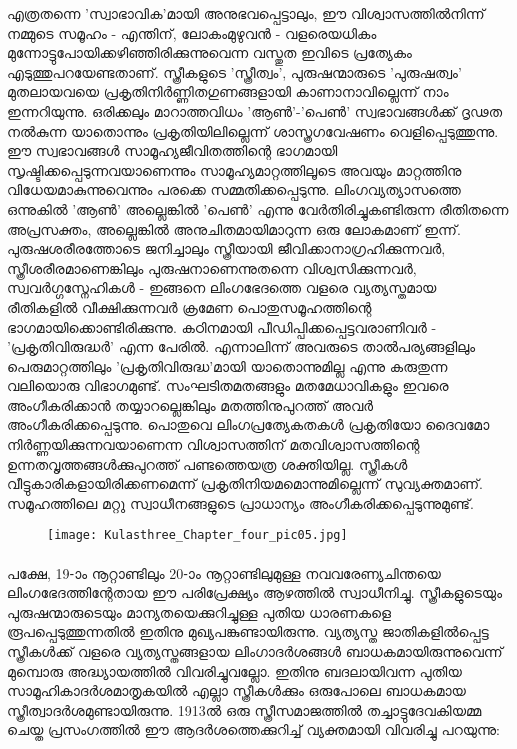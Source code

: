എത്രതന്നെ 'സ്വാഭാവിക'മായി അനുഭവപ്പെട്ടാലും, ഈ വിശ്വാസത്തിൽനിന്ന് നമ്മുടെ സമൂഹം - എന്തിന്, ലോകംമുഴുവൻ - വളരെയധികം മുന്നോട്ടുപോയിക്കഴിഞ്ഞിരിക്കുന്നുവെന്ന വസ്തുത ഇവിടെ പ്രത്യേകം എടുത്തുപറയേണ്ടതാണ്. സ്ത്രീകളുടെ 'സ്ത്രീത്വം', പുരുഷന്മാരുടെ 'പുരുഷത്വം' മുതലായവയെ പ്രകൃതിനിർണ്ണിതഗുണങ്ങളായി കാണാനാവില്ലെന്ന് നാം ഇന്നറിയുന്നു. ഒരിക്കലും മാറാത്തവിധം 'ആൺ'-'പെൺ' സ്വഭാവങ്ങൾക്ക് ദൃഢത നൽകുന്ന യാതൊന്നും പ്രകൃതിയിലില്ലെന്ന് ശാസ്ത്രഗവേഷണം വെളിപ്പെടുത്തുന്നു. ഈ സ്വഭാവങ്ങൾ സാമൂഹ്യജീവിതത്തിന്റെ ഭാഗമായി സൃഷ്ടിക്കപ്പെടുന്നവയാണെന്നും സാമൂഹ്യമാറ്റത്തിലൂടെ അവയും മാറ്റത്തിനു വിധേയമാകുന്നുവെന്നും പരക്കെ സമ്മതിക്കപ്പെടുന്നു. ലിംഗവ്യത്യാസത്തെ ഒന്നുകിൽ 'ആൺ' അല്ലെങ്കിൽ 'പെൺ' എന്നു വേർതിരിച്ചുകണ്ടിരുന്ന രീതിതന്നെ അപ്രസക്തം, അല്ലെങ്കിൽ അനുചിതമായിമാറുന്ന ഒരു ലോകമാണ് ഇന്ന്. പുരുഷശരീരത്തോടെ ജനിച്ചാലും സ്ത്രീയായി ജീവിക്കാനാഗ്രഹിക്കുന്നവർ, സ്ത്രീശരീരമാണെങ്കിലും പുരുഷനാണെന്നുതന്നെ വിശ്വസിക്കുന്നവർ, സ്വവർഗ്ഗസ്നേഹികൾ - ഇങ്ങനെ ലിംഗഭേദത്തെ വളരെ വ്യത്യസ്തമായ രീതികളിൽ വീക്ഷിക്കുന്നവർ ക്രമേണ പൊതുസമൂഹത്തിന്റെ ഭാഗമായിക്കൊണ്ടിരിക്കുന്നു. കഠിനമായി പീഡിപ്പിക്കപ്പെട്ടവരാണിവർ - 'പ്രകൃതിവിരുദ്ധർ' എന്ന പേരിൽ. എന്നാലിന്ന് അവരുടെ താൽപര്യങ്ങളിലും പെരുമാറ്റത്തിലും 'പ്രകൃതിവിരുദ്ധ'മായി യാതൊന്നുമില്ല എന്നു കരുതുന്ന വലിയൊരു വിഭാഗമുണ്ട്. സംഘടിതമതങ്ങളും മതമേധാവികളും ഇവരെ അംഗീകരിക്കാൻ തയ്യാറല്ലെങ്കിലും മതത്തിനുപുറത്ത് അവർ അംഗീകരിക്കപ്പെടുന്നു. പൊതുവെ ലിംഗപ്രത്യേകതകൾ പ്രകൃതിയോ ദൈവമോ നിർണ്ണയിക്കുന്നവയാണെന്ന വിശ്വാസത്തിന് മതവിശ്വാസത്തിന്റെ ഉന്നതവൃത്തങ്ങൾക്കുപുറത്ത് പണ്ടത്തെയത്ര ശക്തിയില്ല. സ്ത്രീകൾ വീട്ടുകാരികളായിരിക്കണമെന്ന് പ്രകൃതിനിയമമൊന്നുമില്ലെന്ന് സുവ്യക്തമാണ്. സമൂഹത്തിലെ മറ്റു സ്വാധീനങ്ങളുടെ പ്രാധാന്യം അംഗീകരിക്കപ്പെടുന്നുമുണ്ട്.

\begin{figure}[h]
\begin{center}
\texttt{[image: Kulasthree\_Chapter\_four\_pic05.jpg]}
\end{center}
\end{figure}


\paragraph{}പക്ഷേ, 19-ാം നൂറ്റാണ്ടിലും 20-ാം നൂറ്റാണ്ടിലുമുള്ള നവവരേണ്യചിന്തയെ ലിംഗഭേദത്തിന്റേതായ ഈ പരിപ്രേക്ഷ്യം ആഴത്തിൽ സ്വാധീനിച്ചു. സ്ത്രീകളുടെയും പുരുഷന്മാരുടെയും മാന്യതയെക്കുറിച്ചുള്ള പുതിയ ധാരണകളെ രൂപപ്പെടുത്തുന്നതിൽ ഇതിനു മുഖ്യപങ്കുണ്ടായിരുന്നു. വ്യത്യസ്ത ജാതികളിൽപ്പെട്ട സ്ത്രീകൾക്ക് വളരെ വ്യത്യസ്തങ്ങളായ ലിംഗാദർശങ്ങൾ ബാധകമായിരുന്നുവെന്ന് മുമ്പൊരു അദ്ധ്യായത്തിൽ വിവരിച്ചുവല്ലോ. ഇതിനു ബദലായിവന്ന പുതിയ സാമൂഹികാദർശമാതൃകയിൽ എല്ലാ സ്ത്രീകൾക്കും ഒരുപോലെ ബാധകമായ സ്ത്രീത്വാദർശമുണ്ടായിരുന്നു. 1913ൽ ഒരു സ്ത്രീസമാജത്തിൽ തച്ചാട്ടുദേവകിയമ്മ ചെയ്ത പ്രസംഗത്തിൽ ഈ ആദർശത്തെക്കുറിച്ച് വ്യക്തമായി വിവരിച്ചു പറയുന്നു:

